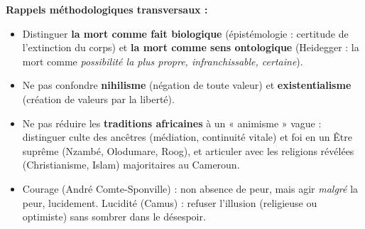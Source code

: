 \documentclass[11pt]{article}
\newcommand{\cle}[1]{{\popxbold\color{popdark}#1}}
\begin{document}
\medskip
\textbf{Rappels méthodologiques transversaux :}
\begin{itemize}
    \item Distinguer \textbf{la mort comme fait biologique} (épistémologie : certitude de l'extinction du corps) et \textbf{la mort comme sens ontologique} (Heidegger : la mort comme \emph{possibilité la plus propre, infranchissable, certaine}).
    \item Ne pas confondre \textbf{nihilisme} (négation de toute valeur) et \textbf{existentialisme} (création de valeurs par la liberté).
    \item Ne pas réduire les \textbf{traditions africaines} à un « animisme » vague : distinguer \cle{culte des ancêtres} (médiation, continuité vitale) et \cle{foi en un Être suprême} (Nzambé, Olodumare, Roog), et articuler avec les religions révélées (Christianisme, Islam) majoritaires au Cameroun.
    \item \cle{Courage} (André Comte-Sponville) : non absence de peur, mais agir \emph{malgré} la peur, lucidement. \cle{Lucidité} (Camus) : refuser l'illusion (religieuse ou optimiste) sans sombrer dans le désespoir.
\end{itemize}
\end{document}
